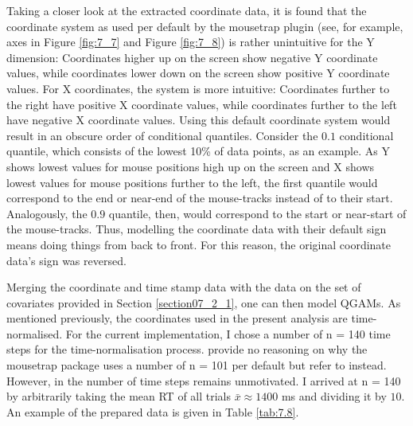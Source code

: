 Taking a closer look at the extracted coordinate data, it is found that the coordinate system as used per default by the mousetrap plugin (see, for example, axes in Figure \ref{fig:7_7} and Figure \ref{fig:7_8}) is rather unintuitive for the Y dimension: Coordinates higher up on the screen show negative Y coordinate values, while coordinates lower down on the screen show positive Y coordinate values. For X coordinates, the system is more intuitive: Coordinates further to the right have positive X coordinate values, while coordinates further to the left have negative X coordinate values. Using this default coordinate system would result in an obscure order of conditional quantiles. Consider the $0.1$ conditional quantile, which consists of the lowest 10\% of data points, as an example. As Y shows lowest values for mouse positions high up on the screen and X shows lowest values for mouse positions further to the left, the first quantile would correspond to the end or near-end of the mouse-tracks instead of to their start. Analogously, the $0.9$ quantile, then, would correspond to the start or near-start of the mouse-tracks. Thus, modelling the coordinate data with their default sign means doing things from back to front. For this reason, the original coordinate data’s sign was reversed.

Merging the coordinate and time stamp data with the data on the set of covariates provided in Section \ref{section07_2_1}, one can then model QGAMs. As mentioned previously, the coordinates used in the present analysis are time-normalised. For the current implementation, I chose a number of n = 140 time steps for the time-normalisation process. \citet{Kieslich2019} provide no reasoning on why the mousetrap package uses a number of n = 101 per default but refer to \citet{Spivey2005} instead. However, in \citet{Spivey2005} the number of time steps remains unmotivated. I arrived at n = 140 by arbitrarily taking the mean RT of all trials $\bar{x}\approx 1400$ ms and dividing it by $10$. An example of the prepared data is given in Table \ref{tab:7.8}.

